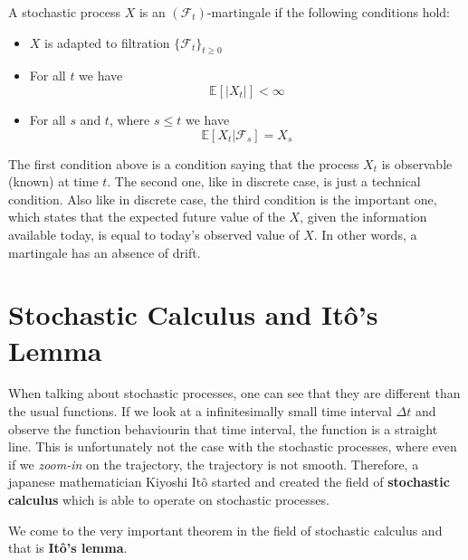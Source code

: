 \documentclass[times, utf8, diplomski]{fer}
\begin{document}
\begin{definition}
A stochastic process $X$ is an $(\mathcal{F}_t)$-martingale if the following conditions hold:
\begin{itemize}
	\item $X$ is adapted to filtration $\{\mathcal{F}_t\}_{t\geq 0}$
	\item For all $t$ we have $$\mathbb{E}[|X_t|] < \infty$$
	\item For all $s$ and $t$, where $s\leq t$ we have $$\mathbb{E}[X_t|\mathcal{F}_s] = X_s$$
\end{itemize}
\end{definition}

The first condition above is a condition saying that the process $X_t$ is observable (known) at time $t$. The second one, like in discrete case, is just a technical condition. Also like in discrete case, the third condition is the important one, which states that the expected future value of the $X$, given the information available today, is equal to today's observed value of $X$. In other words, a martingale has an absence of drift.

\section{Stochastic Calculus and It\^{o}'s Lemma}
When talking about stochastic processes, one can see that they are different than the usual functions. If we look at a infinitesimally small time interval $\Delta t$ and observe the function behaviourin that time interval, the function is a straight line. This is unfortunately not the case with the stochastic processes, where even if we \textit{zoom-in} on the trajectory, the trajectory is not smooth. Therefore, a japanese mathematician Kiyoshi It\^{o} started and created the field of \textbf{stochastic calculus} which is able to operate on stochastic processes. 


We come to the very important theorem in the field of stochastic calculus and that is \textbf{It\^{o}'s lemma}.
\end{document}
